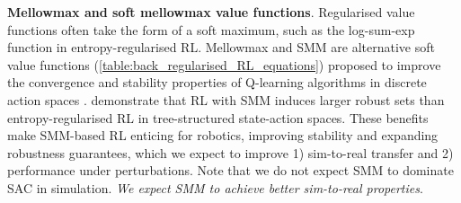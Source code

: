\documentclass{article} %
\begin{document}
        \textbf{Mellowmax and soft mellowmax value functions}.
            Regularised value functions often take the form of a soft maximum, such as the log-sum-exp function in entropy-regularised RL.
            Mellowmax and SMM are alternative soft value functions (\autoref{table:back_regularised_RL_equations}) proposed to improve the convergence and stability properties of Q-learning algorithms in discrete action spaces \citep{asadi2017alternative_mellowmax, gan2021stabilizing_soft_mellowmax}.
            \citet{TGM_2025_jiralerspong} demonstrate that RL with SMM induces larger robust sets than entropy-regularised RL in tree-structured state-action spaces.
            These benefits make SMM-based RL enticing for robotics, improving stability and expanding robustness guarantees, which we expect to improve 1) sim-to-real transfer and 2) performance under perturbations. 
            Note that we do not expect SMM to dominate SAC in simulation. \textit{We expect SMM to achieve better sim-to-real properties}.


            
\end{document}
